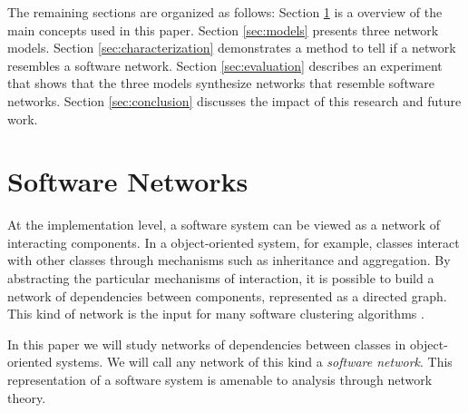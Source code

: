 The remaining sections are organized as follows:
Section \ref{sec:swnets} is a overview of the main concepts used in this paper.
%
Section \ref{sec:models} presents three network models.
%
Section \ref{sec:characterization} demonstrates a method to tell if a network
resembles a software network.
%
Section \ref{sec:evaluation} describes an experiment that shows that the three
models synthesize networks that resemble software networks.
%
Section \ref{sec:conclusion} discusses the impact of this research and future
work.


%

%

\section{Software Networks} \label{sec:swnets}

At the implementation level, a software system can be viewed as a network of
interacting components. In a object-oriented system, for example, classes
interact with other classes through mechanisms such as inheritance and
aggregation. By abstracting the particular mechanisms of interaction, it is
possible to build a network of dependencies between components, represented as a
directed graph. This kind of network is the input for many software clustering
algorithms \cite{Mancoridis1998,Anquetil1999,Tzerpos2000,Andritsos2005}.

In this paper we will study networks of dependencies between classes in
object-oriented systems. We will call any network of this kind a \emph{software
network}. This representation of a software system is amenable to analysis
through network theory. %

